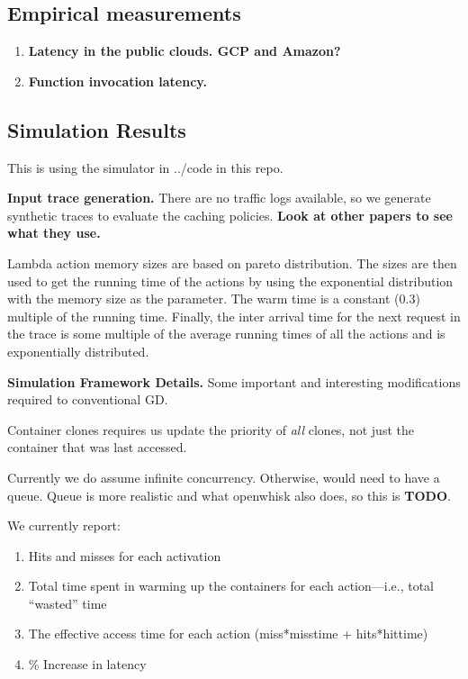 \subsection{Empirical measurements}
\begin{enumerate}
\item \textbf{Latency in the public clouds. GCP and Amazon?}

\item \textbf{Function invocation latency.}
  
\end{enumerate}


\subsection{Simulation Results}

This is using the simulator in ../code in this repo.

\textbf{Input trace generation.}
There are no traffic logs available, so we generate synthetic traces to evaluate the caching policies. \textbf{Look at other papers to see what they use.}


Lambda action memory sizes are based on pareto distribution.
The sizes are then used to get the running time of the actions by using the exponential distribution with the memory size as the parameter.
The warm time is a constant (0.3) multiple of the running time.
Finally, the inter arrival time for the next request in the trace is some multiple of the average running times of all the actions and is exponentially distributed.


\textbf{Simulation Framework Details.}
Some important and interesting modifications required to conventional GD.

Container clones requires us update the priority of \emph{all} clones, not just the container that was last accessed.

Currently we do assume infinite concurrency. Otherwise, would need to have a queue. Queue is more realistic and what openwhisk also does, so this is \textbf{TODO}. 

We currently report:
\begin{enumerate}
\item Hits and misses for each activation
\item Total time spent in warming up the containers for each action---i.e., total ``wasted'' time
\item The effective access time for each action (miss*misstime + hits*hittime)
\item \% Increase in latency 
\end{enumerate}



